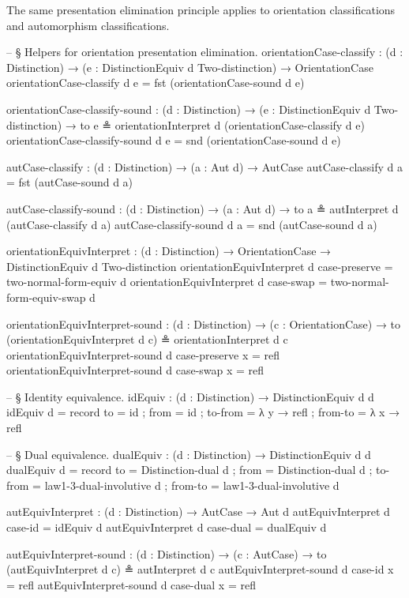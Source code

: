 \documentclass[11pt,a4paper]{book}
\begin{document}
The same presentation elimination principle applies to orientation classifications and automorphism classifications.

\begin{code}
-- § Helpers for orientation presentation elimination.
orientationCase-classify :
  (d : Distinction) →
  (e : DistinctionEquiv d Two-distinction) →
  OrientationCase
orientationCase-classify d e = fst (orientationCase-sound d e)

orientationCase-classify-sound :
  (d : Distinction) →
  (e : DistinctionEquiv d Two-distinction) →
  to e ≗ orientationInterpret d (orientationCase-classify d e)
orientationCase-classify-sound d e = snd (orientationCase-sound d e)

autCase-classify :
  (d : Distinction) →
  (a : Aut d) →
  AutCase
autCase-classify d a = fst (autCase-sound d a)

autCase-classify-sound :
  (d : Distinction) →
  (a : Aut d) →
  to a ≗ autInterpret d (autCase-classify d a)
autCase-classify-sound d a = snd (autCase-sound d a)

orientationEquivInterpret :
  (d : Distinction) →
  OrientationCase →
  DistinctionEquiv d Two-distinction
orientationEquivInterpret d case-preserve = two-normal-form-equiv d
orientationEquivInterpret d case-swap     = two-normal-form-equiv-swap d

orientationEquivInterpret-sound :
  (d : Distinction) →
  (c : OrientationCase) →
  to (orientationEquivInterpret d c) ≗ orientationInterpret d c
orientationEquivInterpret-sound d case-preserve x = refl
orientationEquivInterpret-sound d case-swap     x = refl

-- § Identity equivalence.
idEquiv : (d : Distinction) → DistinctionEquiv d d
idEquiv d = record
  { to      = id
  ; from    = id
  ; to-from = λ y → refl
  ; from-to = λ x → refl
  }

-- § Dual equivalence.
dualEquiv : (d : Distinction) → DistinctionEquiv d d
dualEquiv d = record
  { to      = Distinction-dual d
  ; from    = Distinction-dual d
  ; to-from = law1-3-dual-involutive d
  ; from-to = law1-3-dual-involutive d
  }

autEquivInterpret :
  (d : Distinction) →
  AutCase →
  Aut d
autEquivInterpret d case-id   = idEquiv d
autEquivInterpret d case-dual = dualEquiv d

autEquivInterpret-sound :
  (d : Distinction) →
  (c : AutCase) →
  to (autEquivInterpret d c) ≗ autInterpret d c
autEquivInterpret-sound d case-id   x = refl
autEquivInterpret-sound d case-dual x = refl
\end{code}
\end{document}
